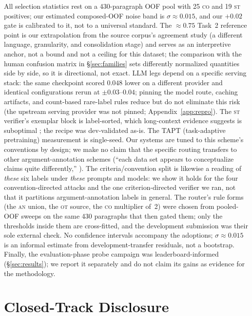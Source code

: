 \documentclass[11pt]{article}
\newcommand{\lab}[1]{\textsc{#1}}
\newcommand{\co}{\lab{co}}
\newcommand{\st}{\lab{st}}
\newcommand{\an}{\lab{an}}
\newcommand{\ot}{\lab{ot}}
\begin{document}
All selection statistics rest on a 430-paragraph OOF pool with 25 \co{}
and 19 \st{} positives; our estimated composed-OOF noise band is
$\sigma{\approx}0.015$, and our $+0.02$ gate is calibrated to it, not to
a universal standard. The ${\approx}0.75$ Task~2 reference point is our
extrapolation from the source corpus's agreement study (a different
language, granularity, and consolidation stage) and serves as an
interpretive anchor, not a bound and not a ceiling for this dataset;
the comparison with the human
confusion matrix in \S\ref{sec:families} sets differently normalized
quantities side by side, so it is directional, not exact. LLM legs depend on a specific serving stack: the same
checkpoint scored $0.048$ lower on a different provider and identical
configurations rerun at $\pm0.03$--$0.04$; pinning the model route, caching
artifacts, and count-based rare-label rules reduce but do not eliminate
this risk (the upstream serving provider was not pinned;
Appendix~\ref{app:repro}). The \st{} verifier's exemplar block is label-sorted, which
long-context evidence suggests is suboptimal
\citep{bertsch-etal-2024-manyshot}; the recipe was dev-validated as-is.
The TAPT (task-adaptive pretraining) measurement is single-seed. Our systems are tuned to
this scheme's conventions by design; we make no
claim that the specific routing transfers to other argument-annotation
schemes (``each data set appears to conceptualize claims quite
differently,''
\citealp{daxenberger-etal-2017-essence,lawrence-reed-2019-argument}).
The criteria/convention split is likewise a reading of \emph{these} six
labels under \emph{these} prompts and models: we show it holds for the
four convention-directed attacks and the one criterion-directed
verifier we ran, not that it partitions argument-annotation labels in
general.
The router's rule forms (the \an{} union, the \ot{} source, the \co{}
multiplier of~2) were chosen from pooled-OOF sweeps on the same 430
paragraphs that then gated them; only the thresholds inside them are
cross-fitted, and the development submission was their sole external
check. No confidence intervals accompany the adoptions;
$\sigma{\approx}0.015$ is an informal estimate from development-transfer
residuals, not a bootstrap. Finally, the evaluation-phase probe campaign
was leaderboard-informed (\S\ref{sec:results}); we report it separately
and do not claim its gains as evidence for the methodology.



\appendix

\section{Closed-Track Disclosure}
\label{app:disclosure}
\end{document}
